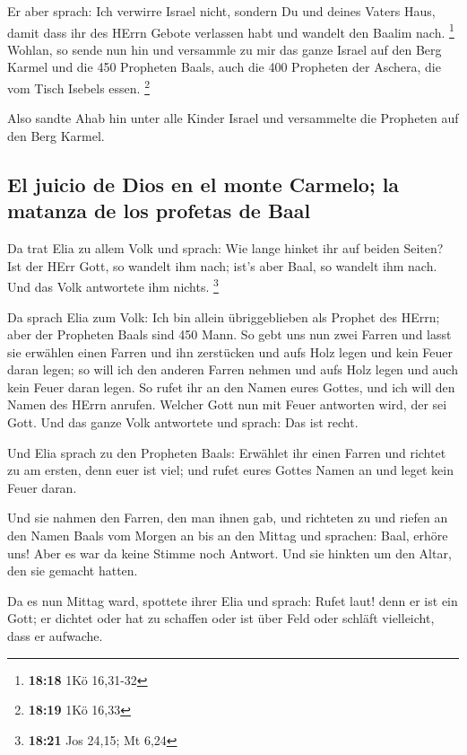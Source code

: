  Er aber sprach: Ich verwirre Israel nicht, sondern Du
und deines Vaters Haus, damit dass ihr des HErrn Gebote verlassen habt
und wandelt den Baalim nach. \footnote{\textbf{18:18} 1Kö 16,31-32}
 Wohlan, so sende nun hin und versammle zu mir das ganze
Israel auf den Berg Karmel und die 450 Propheten Baals, auch die 400
Propheten der Aschera, die vom Tisch Isebels essen. \footnote{\textbf{18:19}
  1Kö 16,33}

 Also sandte Ahab hin unter alle Kinder Israel und
versammelte die Propheten auf den Berg Karmel.

\hypertarget{el-juicio-de-dios-en-el-monte-carmelo-la-matanza-de-los-profetas-de-baal}{%
\subsection{El juicio de Dios en el monte Carmelo; la matanza de los
profetas de
Baal}\label{el-juicio-de-dios-en-el-monte-carmelo-la-matanza-de-los-profetas-de-baal}}

 Da trat Elia zu allem Volk und sprach: Wie lange hinket
ihr auf beiden Seiten? Ist der HErr Gott, so wandelt ihm nach; ist's
aber Baal, so wandelt ihm nach. Und das Volk antwortete ihm nichts.
\footnote{\textbf{18:21} Jos 24,15; Mt 6,24}

 Da sprach Elia zum Volk: Ich bin allein übriggeblieben
als Prophet des HErrn; aber der Propheten Baals sind 450 Mann.
 So gebt uns nun zwei Farren und lasst sie erwählen einen
Farren und ihn zerstücken und aufs Holz legen und kein Feuer daran
legen; so will ich den anderen Farren nehmen und aufs Holz legen und
auch kein Feuer daran legen.  So rufet ihr an den Namen
eures Gottes, und ich will den Namen des HErrn anrufen. Welcher Gott nun
mit Feuer antworten wird, der sei Gott. Und das ganze Volk antwortete
und sprach: Das ist recht.

 Und Elia sprach zu den Propheten Baals: Erwählet ihr
einen Farren und richtet zu am ersten, denn euer ist viel; und rufet
eures Gottes Namen an und leget kein Feuer daran.

 Und sie nahmen den Farren, den man ihnen gab, und
richteten zu und riefen an den Namen Baals vom Morgen an bis an den
Mittag und sprachen: Baal, erhöre uns! Aber es war da keine Stimme noch
Antwort. Und sie hinkten um den Altar, den sie gemacht hatten.

 Da es nun Mittag ward, spottete ihrer Elia und sprach:
Rufet laut! denn er ist ein Gott; er dichtet oder hat zu schaffen oder
ist über Feld oder schläft vielleicht, dass er aufwache.

